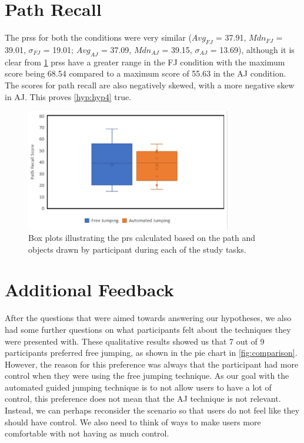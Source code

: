 \section{Path Recall}
\label{subsection EUS: Path Recall}
The \acrfull{prs}s for both the conditions were very similar
($Avg_{FJ}$ = 37.91, $Mdn_{FJ}$ = 39.01, $\sigma_{FJ}$ = 19.01; $Avg_{AJ}$ = 37.09, $Mdn_{AJ}$ = 39.15, $\sigma_{AJ}$ = 13.69), although it is clear from \cref{fig:path-recall} \acrshort{prs}s have a greater range in the FJ condition with the maximum score being 68.54 compared to a maximum score of 55.63 in the AJ condition. The scores for path recall are also negatively skewed, with a more negative skew in AJ. This proves \cref{hyp:hyp4} true.

\begin{figure}[]
	\centering
	\includegraphics[width=0.8\textwidth]{images/path-recall.pdf}
	\caption{Box plots illustrating the \acrshort{prs} calculated based on the path and objects drawn by participant during each of the study tasks.}
	\label{fig:path-recall}
\end{figure}
\section{Additional Feedback}
\label{subsection EUS: Additional Feedback}
After the questions that were aimed towards answering our hypotheses, we also had some further questions on what participants felt about the techniques they were presented with. These qualitative results showed us that 7 out of 9 participants preferred free jumping, as shown in the pie chart in \cref{fig:comparison}. However, the reason for this preference was always that the participant had more control when they were using the free jumping technique. As our goal with the automated guided jumping technique is to not allow users to have a lot of control, this preference does not mean that the AJ technique is not relevant. Instead, we can perhaps reconsider the scenario so that users do not feel like they should have control. We also need to think of ways to make users more comfortable with not having as much control. 

